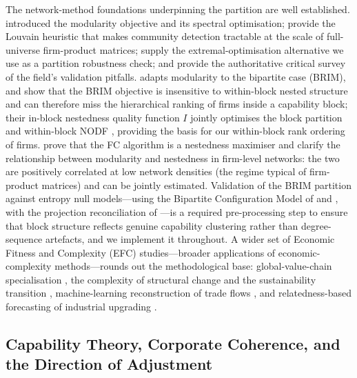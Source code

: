 The network-method foundations underpinning the partition are well established.
\citet{newman2006} introduced the modularity objective and its spectral optimisation;
\citet{blondel2008} provide the Louvain heuristic that makes community detection
tractable at the scale of full-universe firm-product matrices; \citet{ducharenas2005}
supply the extremal-optimisation alternative we use as a partition robustness check;
and \citet{fortunato2016} provide the authoritative critical survey of the field's
validation pitfalls. \citet{barber2007} adapts modularity to the bipartite case (BRIM),
and \citet{soleribalta2018}
show that the BRIM objective is insensitive to within-block
nested structure and can therefore miss the hierarchical ranking of firms inside a
capability block; their in-block nestedness quality function $I$ jointly optimises the
block partition and within-block NODF \citep[the consistent nestedness metric of][]{almeidaneto2008},
providing the basis for our within-block rank ordering of firms. \citet{mariani2019} prove that the FC algorithm is a nestedness
maximiser and clarify the relationship between modularity and nestedness in firm-level
networks: the two are positively correlated at low network densities (the regime typical
of firm-product matrices) and can be jointly estimated. Validation of the BRIM
partition against entropy null models---using the Bipartite Configuration Model of
\citet{squartini2011} and \citet{saracco2015}, with the projection reconciliation of
\citet{cimini2022}---is a required pre-processing step
to ensure that block structure reflects genuine capability clustering rather than
degree-sequence artefacts, and we implement it throughout. A wider set of Economic Fitness and
Complexity (EFC) studies---broader applications of economic-complexity methods---rounds
out the methodological base: global-value-chain specialisation \citep{bontadini2021, bontadini2025},
the complexity of structural change and the sustainability transition
\citep{caldarola2024a, caldarola2024b}, machine-learning reconstruction of trade flows
\citep{gnecco2023}, and relatedness-based forecasting of industrial upgrading
\citep{albora2023a, albora2023b}.

\subsection{Capability Theory, Corporate Coherence, and the Direction of Adjustment}
\label{subsec:lit_cap}

